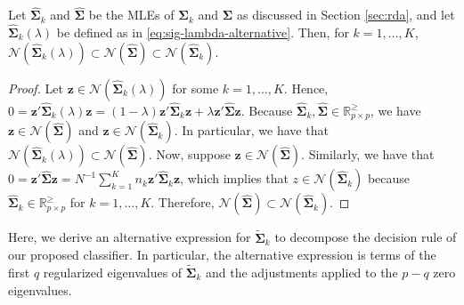 \documentclass[11pt]{article}
\begin{document}
\begin{lemma}\label{lemma:null-spaces}
Let $\widehat{\bm \Sigma}_k$ and $\widehat{\bm \Sigma}$ be the MLEs of $\bm \Sigma_k$ and $\bm \Sigma$ as discussed in Section \ref{sec:rda}, and let $\widehat{\bm \Sigma}_k(\lambda)$ be defined as in \eqref{eq:sig-lambda-alternative}. Then, for $k = 1, \ldots, K$, $\mathcal{N}(\widehat{\bm \Sigma}_k(\lambda)) \subset \mathcal{N}(\widehat{\bm \Sigma}) \subset \mathcal{N}(\widehat{\bm \Sigma}_k)$.
\end{lemma}
\begin{proof}
Let $\bm z \in \mathcal{N}(\widehat{\bm \Sigma}_k(\lambda))$ for some $k = 1, \ldots, K$. Hence, $0 = \bm z' \widehat{\bm \Sigma}_k(\lambda) \bm z = (1 - \lambda) \bm z' \widehat{\bm \Sigma}_k \bm z + \lambda \bm z' \widehat{\bm \Sigma} \bm z$. Because $\widehat{\bm \Sigma}_k, \widehat{\bm \Sigma}\in \mathbb{R}_{p \times p}^{\ge}$, we have $\bm z \in \mathcal{N}(\widehat{\bm \Sigma})$ and $\bm z \in \mathcal{N}(\widehat{\bm \Sigma}_k)$. In particular, we have that $\mathcal{N}(\widehat{\bm \Sigma}_k(\lambda)) \subset \mathcal{N}(\widehat{\bm \Sigma})$. Now, suppose $\bm z \in \mathcal{N}(\widehat{\bm \Sigma})$. Similarly, we have that $0 = \bm z' \widehat{\bm \Sigma} \bm z = N^{-1} \sum_{k = 1}^K n_k \bm z' \widehat{\bm \Sigma}_k \bm z$, which implies that $z \in \mathcal{N}(\widehat{\bm \Sigma}_k)$ because $\widehat{\bm \Sigma}_k \in \mathbb{R}_{p \times p}^{\ge}$ for $k = 1, \ldots, K$. Therefore, $\mathcal{N}(\widehat{\bm \Sigma}) \subset \mathcal{N}(\widehat{\bm \Sigma}_k)$.
\end{proof}

Here, we derive an alternative expression for $\tilde{\bm \Sigma}_k$ to decompose the decision rule of our proposed classifier. In particular, the alternative expression is terms of the first $q$ regularized eigenvalues of $\tilde{\bm \Sigma}_k$ and the adjustments applied to the $p - q$ zero eigenvalues.
\end{document}
